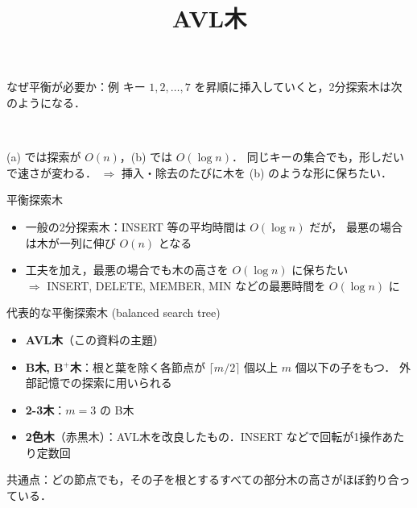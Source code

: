 \documentclass[aspectratio=169,11pt]{beamer}
\title{AVL木}
\date{}
\author{}
\begin{document}
\begin{frame}
  \titlepage
\end{frame}

\begin{frame}{なぜ平衡が必要か：例}
  キー $1,2,\dots,7$ を\alert{昇順}に挿入していくと，2分探索木は次のようになる．
  \centering
  \\[6pt]
  \raggedright (a) では探索が $O(n)$，(b) では $O(\log n)$．
  \alert{同じキーの集合でも，形しだいで速さが変わる}．
  $\Rightarrow$ 挿入・除去のたびに木を (b) のような形に保ちたい．
\end{frame}

\begin{frame}{平衡探索木}
  \begin{itemize}
    \item 一般の2分探索木：INSERT 等の\alert{平均}時間は $O(\log n)$ だが，
          最悪の場合は木が一列に伸び $O(n)$ となる
    \item 工夫を加え，\alert{最悪の場合でも}木の高さを $O(\log n)$ に保ちたい
          \\[2pt]
          $\Rightarrow$ INSERT, DELETE, MEMBER, MIN などの最悪時間を $O(\log n)$ に
  \end{itemize}
  \vspace{4pt}
  \begin{block}{代表的な平衡探索木 (balanced search tree)}
    \begin{itemize}
      \item \textbf{AVL木}（この資料の主題）
      \item \textbf{B木, B$^{+}$木}：根と葉を除く各節点が $\lceil m/2\rceil$ 個以上 $m$ 個以下の子をもつ．
            外部記憶での探索に用いられる
      \item \textbf{2-3木}：$m=3$ の B木
      \item \textbf{2色木}（赤黒木）：AVL木を改良したもの．INSERT などで回転が1操作あたり定数回
    \end{itemize}
  \end{block}
  \small 共通点：どの節点でも，その子を根とするすべての部分木の高さがほぼ釣り合っている．
\end{frame}
\end{document}
